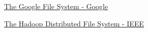 \begin{thebibliography}{99}

  \href{https://static.googleusercontent.com/media/research.google.com/en//archive/gfs-sosp2003.pdf?source=sh/x/srp/wr/m1/1&kgs=9116321736f11bae}{The Google File System - Google}
  
  \href{https://pages.cs.wisc.edu/~akella/CS838/F16/838-CloudPapers/hdfs.pdf}{The Hadoop Distributed File System - IEEE}
  
\end{thebibliography}
  